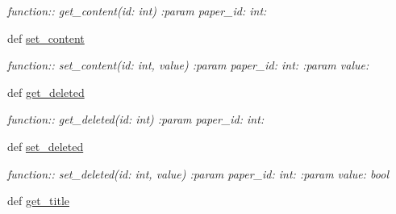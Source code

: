 \begin{DoxyCompactItemize}
\begin{DoxyCompactList}\small\item\em function\+:\+: get\+\_\+content(id\+: int) \+:param paper\+\_\+id\+: int\+: \end{DoxyCompactList}\item 
def \hyperlink{classplume-creator_1_1src_1_1plume_1_1data_1_1tree_1_1tree_1_1_tree_aa5b1e401bc34041e6d2ca225b9d88096}{set\+\_\+content}\hypertarget{classplume-creator_1_1src_1_1plume_1_1data_1_1tree_1_1tree_1_1_tree_aa5b1e401bc34041e6d2ca225b9d88096}{}\label{classplume-creator_1_1src_1_1plume_1_1data_1_1tree_1_1tree_1_1_tree_aa5b1e401bc34041e6d2ca225b9d88096}

\begin{DoxyCompactList}\small\item\em function\+:\+: set\+\_\+content(id\+: int, value) \+:param paper\+\_\+id\+: int\+: \+:param value\+: \end{DoxyCompactList}\item 
def \hyperlink{classplume-creator_1_1src_1_1plume_1_1data_1_1tree_1_1tree_1_1_tree_a2a573bfd491544d2187b7452f0d89f0b}{get\+\_\+deleted}\hypertarget{classplume-creator_1_1src_1_1plume_1_1data_1_1tree_1_1tree_1_1_tree_a2a573bfd491544d2187b7452f0d89f0b}{}\label{classplume-creator_1_1src_1_1plume_1_1data_1_1tree_1_1tree_1_1_tree_a2a573bfd491544d2187b7452f0d89f0b}

\begin{DoxyCompactList}\small\item\em function\+:\+: get\+\_\+deleted(id\+: int) \+:param paper\+\_\+id\+: int\+: \end{DoxyCompactList}\item 
def \hyperlink{classplume-creator_1_1src_1_1plume_1_1data_1_1tree_1_1tree_1_1_tree_ad471b761a4ac465023258800aa58794c}{set\+\_\+deleted}\hypertarget{classplume-creator_1_1src_1_1plume_1_1data_1_1tree_1_1tree_1_1_tree_ad471b761a4ac465023258800aa58794c}{}\label{classplume-creator_1_1src_1_1plume_1_1data_1_1tree_1_1tree_1_1_tree_ad471b761a4ac465023258800aa58794c}

\begin{DoxyCompactList}\small\item\em function\+:\+: set\+\_\+deleted(id\+: int, value) \+:param paper\+\_\+id\+: int\+: \+:param value\+: bool \end{DoxyCompactList}\item 
def \hyperlink{classplume-creator_1_1src_1_1plume_1_1data_1_1tree_1_1tree_1_1_tree_a65a306e469b1d3c3765b26e76b76d322}{get\+\_\+title}\hypertarget{classplume-creator_1_1src_1_1plume_1_1data_1_1tree_1_1tree_1_1_tree_a65a306e469b1d3c3765b26e76b76d322}{}\label{classplume-creator_1_1src_1_1plume_1_1data_1_1tree_1_1tree_1_1_tree_a65a306e469b1d3c3765b26e76b76d322}


\end{DoxyCompactItemize}
